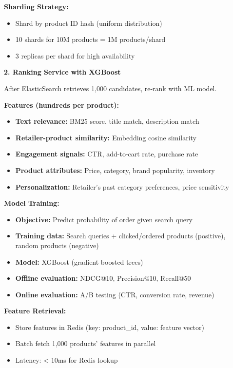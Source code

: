 \documentclass[11pt,letterpaper]{article}
\begin{document}
\textbf{Sharding Strategy:}
\begin{itemize}
    \item Shard by product ID hash (uniform distribution)
    \item 10 shards for 10M products = 1M products/shard
    \item 3 replicas per shard for high availability
\end{itemize}

\textbf{2. Ranking Service with XGBoost}

After ElasticSearch retrieves 1,000 candidates, re-rank with ML model.

\textbf{Features (hundreds per product):}
\begin{itemize}
    \item \textbf{Text relevance:} BM25 score, title match, description match
    \item \textbf{Retailer-product similarity:} Embedding cosine similarity
    \item \textbf{Engagement signals:} CTR, add-to-cart rate, purchase rate
    \item \textbf{Product attributes:} Price, category, brand popularity, inventory
    \item \textbf{Personalization:} Retailer's past category preferences, price sensitivity
\end{itemize}

\textbf{Model Training:}
\begin{itemize}
    \item \textbf{Objective:} Predict probability of order given search query
    \item \textbf{Training data:} Search queries + clicked/ordered products (positive), random products (negative)
    \item \textbf{Model:} XGBoost (gradient boosted trees)
    \item \textbf{Offline evaluation:} NDCG@10, Precision@10, Recall@50
    \item \textbf{Online evaluation:} A/B testing (CTR, conversion rate, revenue)
\end{itemize}

\textbf{Feature Retrieval:}
\begin{itemize}
    \item Store features in Redis (key: product\_id, value: feature vector)
    \item Batch fetch 1,000 products' features in parallel
    \item Latency: < 10ms for Redis lookup
\end{itemize}
\end{document}
